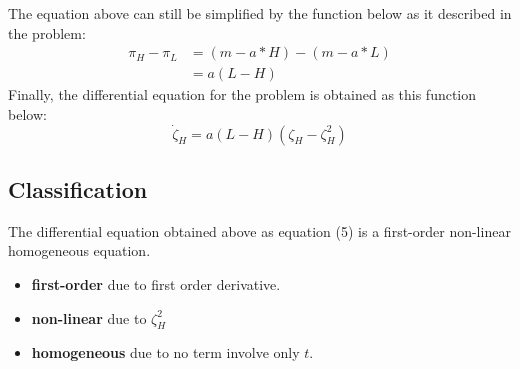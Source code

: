 \documentclass[a4paper, 12pt]{article}
\begin{document}
The equation above can still be simplified by the function below as it described in the problem: 
\vspace{-3mm}
\begin{equation}
\begin{split}
	\pi_{H} - \pi_{L} & =  (m - a*H)-(m-a*L) \\
	& = a(L - H)
\end{split}		
\end{equation}
Finally, the differential equation for the problem is obtained as this function below:
\vspace{-3mm}
\begin{equation}
	\dot\zeta_{H} = a(L-H)(\zeta_{H}-\zeta_{H}^{2})
\end{equation}

\subsection{Classification}
The differential equation obtained above as equation (5) is a first-order non-linear homogeneous equation.
\begin{itemize}[nolistsep]
	\item \textbf{first-order} due to first order derivative.
	\item \textbf{non-linear} due to $\zeta_{H}^{2}$
	\item \textbf{homogeneous} due to no term involve only $t$.
\end{itemize}
\end{document}
